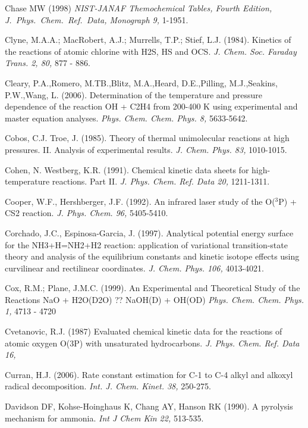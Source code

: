 \documentclass[12pt,landscape]{article}
\newcounter{reaction}
\begin{document}
Chase MW (1998) {\em NIST-JANAF Themochemical Tables, Fourth Edition, J.\ Phys.\ Chem.\ Ref.\ Data, Monograph 9,} 1-1951.

Clyne, M.A.A.; MacRobert, A.J.; Murrells, T.P.; Stief, L.J. (1984). Kinetics of the reactions of atomic chlorine with H2S, HS and OCS.
{\em J. Chem. Soc. Faraday Trans. 2, 80,} 877 - 886.

Cleary, P.A.,Romero, M.TB.,Blitz, M.A.,Heard, D.E.,Pilling, M.J.,Seakins, P.W.,Wang, L. (2006). Determination of the temperature and pressure dependence of the reaction OH + C2H4 from 200-400 K using experimental and master equation analyses. {\em Phys. Chem. Chem. Phys. 8,} 5633-5642.

Cobos, C.J. Troe, J. (1985). Theory of thermal unimolecular reactions at high pressures. II. Analysis of experimental results. {\em  J. Chem. Phys. 83,} 1010-1015.

Cohen, N. Westberg, K.R. (1991).  Chemical kinetic data sheets for high-temperature reactions. Part II.
{\em J. Phys. Chem. Ref. Data  20,}  1211-1311.

Cooper, W.F., Hershberger, J.F. (1992).  An infrared laser study of the O($^3$P) + CS2 reaction.   {\em J. Phys. Chem. 96,} 5405-5410.

Corchado, J.C., Espinosa-Garcia, J. (1997). Analytical potential energy surface for the NH3+H=NH2+H2 reaction: application of variational transition-state theory and analysis of the equilibrium constants and kinetic isotope effects using curvilinear and rectilinear coordinates. {\em J. Chem. Phys. 106,} 4013-4021.

Cox, R.M.; Plane, J.M.C. (1999). An Experimental and Theoretical Study of the Reactions NaO + H2O(D2O) ?? NaOH(D) + OH(OD)
{\em Phys. Chem. Chem. Phys. 1,} 4713 - 4720

Cvetanovic, R.J. (1987) Evaluated chemical kinetic data for the reactions of atomic oxygen O(3P) with unsaturated hydrocarbons.
{\em J. Phys. Chem. Ref. Data 16,}

Curran, H.J. (2006). Rate constant estimation for C-1 to C-4 alkyl and alkoxyl radical decomposition.  {\em Int. J. Chem. Kinet. 38,} 250-275.

Davidson DF, Kohse-Hoinghaus K, Chang AY, Hanson RK (1990). A pyrolysis mechanism for ammonia.  {\em Int J Chem Kin 22,} 513-535.
\end{document}
